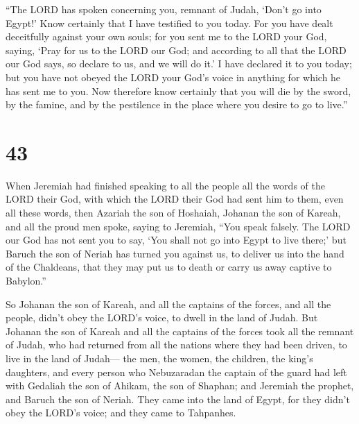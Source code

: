  ``The LORD has spoken concerning you, remnant of Judah,
`Don't go into Egypt!' Know certainly that I have testified to you
today.  For you have dealt deceitfully against your own
souls; for you sent me to the LORD your God, saying, `Pray for us to the
LORD our God; and according to all that the LORD our God says, so
declare to us, and we will do it.'  I have declared it to
you today; but you have not obeyed the LORD your God's voice in anything
for which he has sent me to you.  Now therefore know
certainly that you will die by the sword, by the famine, and by the
pestilence in the place where you desire to go to live.''

\hypertarget{section-42}{%
\section{43}\label{section-42}}

 When Jeremiah had finished speaking to all the people all
the words of the LORD their God, with which the LORD their God had sent
him to them, even all these words,  then Azariah the son
of Hoshaiah, Johanan the son of Kareah, and all the proud men spoke,
saying to Jeremiah, ``You speak falsely. The LORD our God has not sent
you to say, `You shall not go into Egypt to live there;' 
but Baruch the son of Neriah has turned you against us, to deliver us
into the hand of the Chaldeans, that they may put us to death or carry
us away captive to Babylon.''

 So Johanan the son of Kareah, and all the captains of the
forces, and all the people, didn't obey the LORD's voice, to dwell in
the land of Judah.  But Johanan the son of Kareah and all
the captains of the forces took all the remnant of Judah, who had
returned from all the nations where they had been driven, to live in the
land of Judah---  the men, the women, the children, the
king's daughters, and every person who Nebuzaradan the captain of the
guard had left with Gedaliah the son of Ahikam, the son of Shaphan; and
Jeremiah the prophet, and Baruch the son of Neriah.  They
came into the land of Egypt, for they didn't obey the LORD's voice; and
they came to Tahpanhes.

